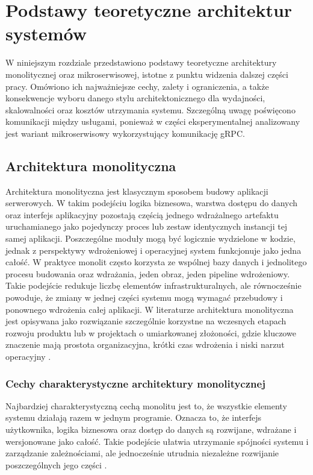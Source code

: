 \chapter{Podstawy teoretyczne architektur systemów}
\label{chapter:archo}
W niniejszym rozdziale przedstawiono podstawy teoretyczne architektury monolitycznej oraz mikroserwisowej, istotne z punktu widzenia dalszej części pracy. Omówiono ich najważniejsze cechy, zalety i ograniczenia, a także konsekwencje wyboru danego stylu architektonicznego dla wydajności, skalowalności oraz kosztów utrzymania systemu. Szczególną uwagę poświęcono komunikacji między usługami, ponieważ w części eksperymentalnej analizowany jest wariant mikroserwisowy wykorzystujący komunikację gRPC.

\section{Architektura monolityczna}
\label{sec:monolithic-architecture}

Architektura monolityczna jest klasycznym sposobem budowy aplikacji serwerowych. W takim podejściu logika biznesowa, warstwa dostępu do danych oraz interfejs aplikacyjny pozostają częścią jednego wdrażalnego artefaktu uruchamianego jako pojedynczy proces lub zestaw identycznych instancji tej samej aplikacji. Poszczególne moduły mogą być logicznie wydzielone w kodzie, jednak z perspektywy wdrożeniowej i operacyjnej system funkcjonuje jako jedna całość. W praktyce monolit często korzysta ze wspólnej bazy danych i jednolitego procesu budowania oraz wdrażania, jeden obraz, jeden pipeline wdrożeniowy. Takie podejście redukuje liczbę elementów infrastrukturalnych, ale równocześnie powoduje, że zmiany w jednej części systemu mogą wymagać przebudowy i ponownego wdrożenia całej aplikacji. W literaturze architektura monolityczna jest opisywana jako rozwiązanie szczególnie korzystne na wczesnych etapach rozwoju produktu lub w projektach o umiarkowanej złożoności, gdzie kluczowe znaczenie mają prostota organizacyjna, krótki czas wdrożenia i niski narzut operacyjny \cite{gravanis2021monoliths, milic2022quality, kaloudis2024evolving}.

\subsection{Cechy charakterystyczne architektury monolitycznej}
\label{subsec:monolith-characteristics}

Najbardziej charakterystyczną cechą monolitu jest to, że wszystkie elementy systemu działają razem w jednym programie. Oznacza to, że interfejs użytkownika, logika biznesowa oraz dostęp do danych są rozwijane, wdrażane i wersjonowane jako całość. Takie podejście ułatwia utrzymanie spójności systemu i zarządzanie zależnościami, ale jednocześnie utrudnia niezależne rozwijanie poszczególnych jego części \cite{tapia2020monolithic}.

